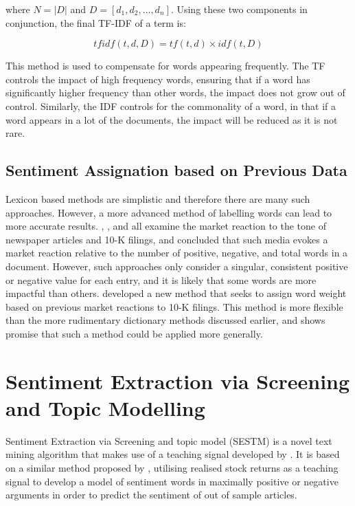 \noindent
where $N = |D|$ and $D = [d_1, d_2, \dots, d_n]$. Using these two components in conjunction, the final TF-IDF of a term is:

\begin{equation}
tfidf(t,d,D) = tf(t,d) \times idf(t,D)
\end{equation}

\noindent
This method is used to compensate for words appearing frequently. The TF controls the impact of high frequency words, ensuring that if a word has significantly higher frequency than other words, the impact does not grow out of control. Similarly, the IDF controls for the commonality of a word, in that if a word appears in a lot of the documents, the impact will be reduced as it is not rare.

\subsection{Sentiment Assignation based on Previous Data}
Lexicon based methods are simplistic and therefore there are many such approaches. However, a more advanced method of labelling words can lead to more accurate results. \textcite{tetlock2007content}, \textcite{tetlock2008quantifying}, and \textcite{lm-dict} all examine the market reaction to the tone of newspaper articles and 10-K filings, and concluded that such media evokes a market reaction relative to the number of positive, negative, and total words in a document. However, such approaches only consider a singular, consistent positive or negative value for each entry, and it is likely that some words are more impactful than others. \textcite{jegadeesh2013word} developed a new method that seeks to assign word weight based on previous market reactions to 10-K filings. This method is more flexible than the more rudimentary dictionary methods discussed earlier, and shows promise that such a method could be applied more generally.

\section{Sentiment Extraction via Screening and Topic Modelling}
Sentiment Extraction via Screening and topic model (SESTM) is a novel text mining algorithm that makes use of a teaching signal developed by \textcite{sestm}. It is based on a similar method proposed by \textcite{jegadeesh2013word}, utilising realised stock returns as a teaching signal to develop a model of sentiment words in maximally positive or negative arguments in order to predict the sentiment of out of sample articles.

